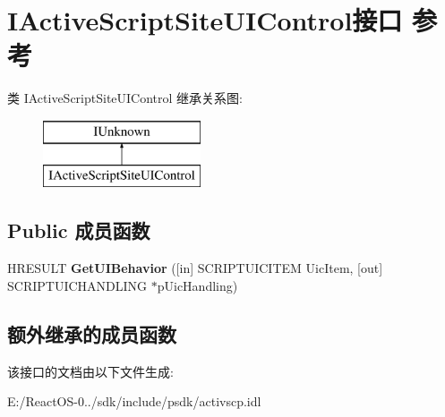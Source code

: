 \hypertarget{interface_i_active_script_site_u_i_control}{}\section{I\+Active\+Script\+Site\+U\+I\+Control接口 参考}
\label{interface_i_active_script_site_u_i_control}
类 I\+Active\+Script\+Site\+U\+I\+Control 继承关系图\+:\begin{figure}[H]
\begin{center}
\leavevmode
\includegraphics[height=2.000000cm]{interface_i_active_script_site_u_i_control}
\end{center}
\end{figure}
\subsection*{Public 成员函数}
\begin{DoxyCompactItemize}
\item 
\mbox{\label{interface_i_active_script_site_u_i_control_ae9935c80c84545ff516ae8a253760f03}} 
H\+R\+E\+S\+U\+LT {\bfseries Get\+U\+I\+Behavior} (\mbox{[}in\mbox{]} S\+C\+R\+I\+P\+T\+U\+I\+C\+I\+T\+EM Uic\+Item, \mbox{[}out\mbox{]} S\+C\+R\+I\+P\+T\+U\+I\+C\+H\+A\+N\+D\+L\+I\+NG $\ast$p\+Uic\+Handling)
\end{DoxyCompactItemize}
\subsection*{额外继承的成员函数}


该接口的文档由以下文件生成\+:\begin{DoxyCompactItemize}
\item 
E\+:/\+React\+O\+S-\/0../sdk/include/psdk/activscp.\+idl\end{DoxyCompactItemize}
